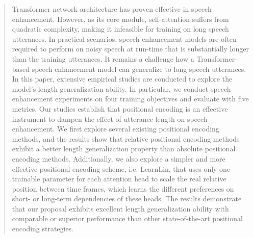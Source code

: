 \documentclass[journal]{IEEEtran}
\newcommand{\qian}[1]{{\color{magenta}#1}}
\begin{document}
\begin{abstract} 

Transformer network architecture has proven effective in speech enhancement. However, as its core module, self-attention suffers from quadratic complexity, making it infeasible for training on long speech utterances. In practical scenarios, speech enhancement models are often required to perform on noisy speech at run-time that is substantially longer than the training utterances. It remains a challenge how a Transformer-based speech enhancement model can generalize to long speech utterances. In this paper, extensive empirical studies are conducted to explore the model's length generalization ability. In particular, we conduct speech enhancement experiments on four training objectives and evaluate with five metrics. Our studies establish that positional encoding is an effective instrument to dampen the effect of utterance length on speech enhancement. We first explore several existing positional encoding methods, and the results show that relative positional encoding methods exhibit a better length generalization property than absolute positional encoding methods. Additionally, we also explore a simpler and more effective positional encoding scheme, i.e. LearnLin, that uses only one trainable parameter for each attention head to scale the real relative position between time frames, which learns the different preferences on short- or long-term dependencies of these heads. The results demonstrate that our proposal exhibits excellent length generalization ability with comparable or superior performance than other state-of-the-art positional encoding strategies.





\end{abstract}
\end{document}

